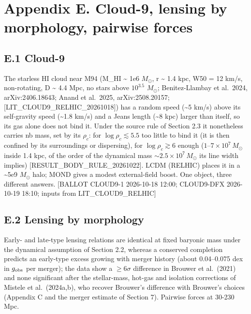 \documentclass[
  10pt,
]{article}
\begin{document}
\section{Appendix E. Cloud-9, lensing by morphology, pairwise forces}\label{appendix-e.-cloud-9-lensing-by-morphology-pairwise-forces}

\subsection{E.1 Cloud-9}

The starless HI cloud near M94 (M\_HI \textasciitilde{} 1e6
$M_\odot$, r \textasciitilde{} 1.4 kpc, W50 = 12 km/s, non-rotating, D
\textasciitilde{} 4.4 Mpc, no stars above $10^{3.5}$ $M_\odot$;
Benitez-Llambay et al.~2024, arXiv:2406.18643; Anand et al.~2025,
arXiv:2508.20157; {[}LIT\_CLOUD9\_RELHIC\_20261018{]}) has a random
speed (\textasciitilde{}5 km/s) above its self-gravity speed
(\textasciitilde{}1.8 km/s) and a Jeans length (\textasciitilde{}8 kpc)
larger than itself, so its gas alone does not bind it. Under the source rule of
Section 2.3 it nonetheless carries nb mass, set by its $\rho_c$: for
$\log\rho_c\lesssim5.5$ too little to bind it (it is then confined by its
surroundings or dispersing), for $\log\rho_c\gtrsim6$ enough
($1$--$7\times10^7\,M_\odot$ inside 1.4 kpc, of the order of the dynamical mass
$\sim2.5\times10^7\,M_\odot$ its line width implies)
{[}RESULT\_BODY\_RULE\_20261022{]}. LCDM (RELHIC) places it in a
\textasciitilde{}5e9 $M_\odot$ halo; MOND gives a modest external-field boost.
One object, three different answers. {[}BALLOT CLOUD9-1 2026-10-18
12:00; CLOUD9-DFX 2026-10-19 18:10; inputs from LIT\_CLOUD9\_RELHIC{]}

\subsection{E.2 Lensing by morphology}

Early- and late-type lensing relations are identical at fixed baryonic mass under the dynamical assumption of Section 2.2, whereas a conserved completion predicts an early-type excess growing with merger history (about 0.04--0.075 dex in $g_{\rm obs}$ per merger); the data show a $\ge6\sigma$ difference in Brouwer et al.~(2021) and none significant after the stellar-mass, hot-gas and isolation corrections of Mistele et al.~(2024a,b), who recover Brouwer's difference with Brouwer's choices (Appendix C and the merger estimate of Section 7). Pairwise forces at 30-230 Mpc.
\end{document}
